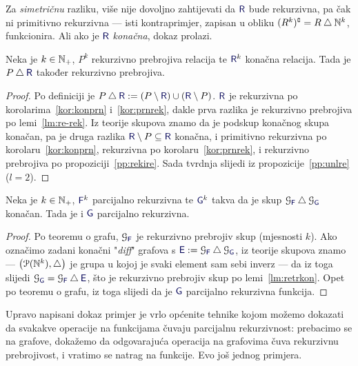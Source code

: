 Za \emph{simetričnu} razliku, više nije dovoljno zahtijevati da $\f R$ bude rekurzivna, pa čak ni primitivno rekurzivna --- isti kontraprimjer, zapisan u obliku $(R^k)\sp{{\scriptscriptstyle\complement}}=R\mathbin\triangle{\mathbb N}^k$, funkcionira. Ali ako je $\f R$ \emph{konačna}, dokaz prolazi.

\begin{lema}[{name=[rekurzivna prebrojivost simetrične razlike s konačnom relacijom]}]\label{lm:retrkon}
Neka je $k\in{\mathbb N}_+$, $P^k$ rekurzivno prebrojiva relacija te $\f R^k$ konačna relacija. Tada je $P\mathbin\triangle\f R$ također rekurzivno prebrojiva.
\end{lema}
\begin{proof}
Po definiciji je $P\mathbin\triangle\f R:=(P\setminus\f R)\cup(\f R\setminus P)$. 
    $\f R$ je rekurzivna po korolarima~\ref{kor:konprn} i~\ref{kor:prnrek}, dakle prva razlika je rekurzivno prebrojiva po lemi~\ref{lm:re-rek}. Iz teorije skupova znamo da je podskup konačnog skupa konačan, pa je druga razlika $\f R\setminus P\subseteq\f R$ konačna, i primitivno rekurzivna po korolaru~\ref{kor:konprn}, rekurzivna po korolaru~\ref{kor:prnrek}, i rekurzivno prebrojiva po propoziciji~\ref{pp:rekire}. Sada tvrdnja slijedi iz propozicije~\ref{pp:unlre} ($l=2$). %
\end{proof}

\begin{propozicija}[{name=[teorem o editiranju za parcijalne funkcije]}]
Neka je $k\in{\mathbb N}_+$, $\f F^k$ parcijalno rekurzivna te $\f G^k$ takva da je skup $\graf{\f F}\mathbin\triangle\graf{\f G}$ konačan. Tada je i $\f G$ parcijalno rekurzivna.
\end{propozicija}
\begin{proof}
Po teoremu o grafu, $\graf{\f F}$ je rekurzivno prebrojiv skup (mjesnosti $k$). Ako označimo zadani konačni "\emph{\!diff}" grafova s $\f E:=\graf{\f F}\mathbin\triangle\graf{\f G}$, iz teorije skupova znamo --- $\bigl(\mathcal P({\mathbb N}^k),\mathbin\triangle\bigr)$ je grupa u kojoj je svaki element sam sebi inverz --- da iz toga slijedi $\graf{\f G}=\graf{\f F}\mathbin\triangle\f E$, što je rekurzivno prebrojiv skup po lemi~\ref{lm:retrkon}. Opet po teoremu o grafu, iz toga slijedi da je $\f G$ parcijalno rekurzivna funkcija.
\end{proof}

Upravo napisani dokaz primjer je vrlo općenite tehnike kojom možemo dokazati da svakakve operacije na funkcijama čuvaju parcijalnu rekurzivnost: prebacimo se na grafove, dokažemo da odgovarajuća operacija na grafovima čuva rekurzivnu prebrojivost, i vratimo se natrag na funkcije. Evo još jednog primjera.

